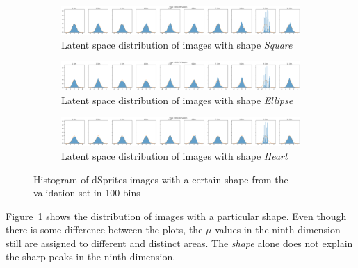 \begin{figure}
    \centering
    \begin{subfigure}{\textwidth}
        \centering
        \includegraphics[width=\textwidth]{images/latent_space_entanglement/vae_dsprites_lf_10000_dist_shape_1.png}
        \caption{Latent space distribution of images with shape \textit{Square}}
    \end{subfigure}
    \begin{subfigure}{\textwidth}
        \centering
        \includegraphics[width=\textwidth]{images/latent_space_entanglement/vae_dsprites_lf_10000_dist_shape_2.png}
        \caption{Latent space distribution of images with shape \textit{Ellipse}}
    \end{subfigure}
    \begin{subfigure}{\textwidth}
        \centering
        \includegraphics[width=\textwidth]{images/latent_space_entanglement/vae_dsprites_lf_10000_dist_shape_3.png}
        \caption{Latent space distribution of images with shape \textit{Heart}}
    \end{subfigure}
    \caption[VAE Latent Space Distribution - dSprites Shapes]{Histogram of dSprites images with a certain shape from the validation set in 100 bins}
    \label{fig:10000_vae_latent_space_distribution_shapes}
\end{figure}

Figure~\ref{fig:10000_vae_latent_space_distribution_shapes} shows the distribution of images with a particular shape.
Even though there is some difference between the plots, the $\mu$-values in the ninth dimension still are assigned to different and distinct areas.
The \textit{shape} alone does not explain the sharp peaks in the ninth dimension.


